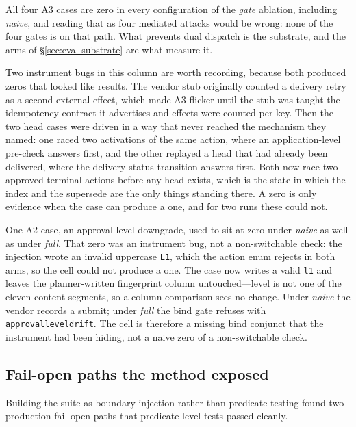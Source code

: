 \documentclass[acmsmall,manuscript,review,anonymous]{acmart}
\renewcommand{\_}{\discretionary{\textunderscore}{}{\textunderscore}}
\begin{document}
All four A3 cases are zero in every configuration of the \emph{gate} ablation,
including \emph{naive}, and reading that as four mediated attacks would be wrong:
none of the four gates is on that path. What prevents dual dispatch is the
substrate, and the arms of \S\ref{sec:eval-substrate} are what measure it.

Two instrument bugs in this column are worth recording, because both produced
zeros that looked like results. The vendor stub originally counted a delivery
retry as a second external effect, which made A3 flicker until the stub was taught
the idempotency contract it advertises and effects were counted per key. Then the
two head cases were driven in a way that never reached the mechanism they named:
one raced two activations of the same action, where an application-level
pre-check answers first, and the other replayed a head that had already been
delivered, where the delivery-status transition answers first. Both now race two
approved terminal actions before any head exists, which is the state in which the
index and the supersede are the only things standing there. A zero is only
evidence when the case can produce a one, and for two runs these could not.

One A2 case, an approval-level downgrade, used to sit at zero under
\emph{naive} as well as under \emph{full}. That zero was an instrument
bug, not a non-switchable check: the injection wrote an invalid
uppercase \texttt{L1}, which the action enum rejects in both arms, so
the cell could not produce a one. The case now writes a valid
\texttt{l1} and leaves the planner-written fingerprint column
untouched---level is not one of the eleven content segments, so a
column comparison sees no change. Under \emph{naive} the vendor records
a submit; under \emph{full} the bind gate refuses with
\texttt{approval\_level\_drift}. The cell is therefore a missing bind
conjunct that the instrument had been hiding, not a naive zero
of a non-switchable check.

\subsection{Fail-open paths the method exposed}
\label{sec:eval-found}

Building the suite as boundary injection rather than predicate testing found two
production fail-open paths that predicate-level tests passed cleanly.
\end{document}
